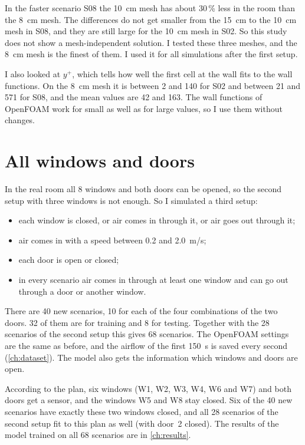 In the faster scenario S08 the 10~cm mesh has about 30\,\% less \cotwo{} in the room than the 8~cm mesh. The
differences do not get smaller from the 15~cm to the 10~cm mesh in S08, and they are still large for the 10~cm mesh
in S02. So this study does not show a mesh-independent solution. I tested these three meshes, and the 8~cm
mesh is the finest of them. I used it for all simulations after the first setup.

I also looked at $y^+$, which tells how well the first cell at the wall fits to the wall functions. On the
8~cm mesh it is between 2 and 140 for S02 and between 21 and 571 for S08, and the mean values are 42 and 163.
The wall functions of OpenFOAM work for small as well as for large values, so I use them without changes.

\section{All windows and doors}
\label{sec:allopen}
In the real room all 8 windows and both doors can be opened, so the second setup with three windows is not
enough. So I simulated a third setup:
\begin{itemize}
  \item each window is closed, or air comes in through it, or air goes out through it;
  \item air comes in with a speed between 0.2 and 2.0~m/s;
  \item each door is open or closed;
  \item in every scenario air comes in through at least one window and can go out through a door or another
        window.
\end{itemize}
There are 40 new scenarios, 10 for each of the four combinations of the two doors. 32 of them are for
training and 8 for testing. Together with the 28 scenarios of the second setup this gives 68 scenarios. The
OpenFOAM settings are the same as before, and the airflow of the first 150~s is saved every second
(\cref{ch:dataset}). The model also gets the information which windows and doors are open.

According to the plan, six windows (W1, W2, W3, W4, W6 and W7) and both doors get a sensor, and the windows
W5 and W8 stay closed. Six of the 40 new scenarios have exactly these two windows closed, and all 28 scenarios
of the second setup fit to this plan as well (with door~2 closed). The results of the model trained on all 68
scenarios are in \cref{ch:results}.
